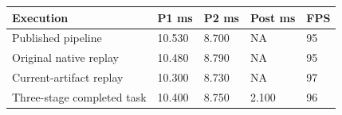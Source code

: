\begin{tabular}{lllll}
\hline
Execution & P1 ms & P2 ms & Post ms & FPS \\
\hline
Published pipeline & 10.530 & 8.700 & NA & 95 \\
Original native replay & 10.480 & 8.790 & NA & 95 \\
Current-artifact replay & 10.300 & 8.730 & NA & 97 \\
Three-stage completed task & 10.400 & 8.750 & 2.100 & 96 \\
\hline
\end{tabular}
